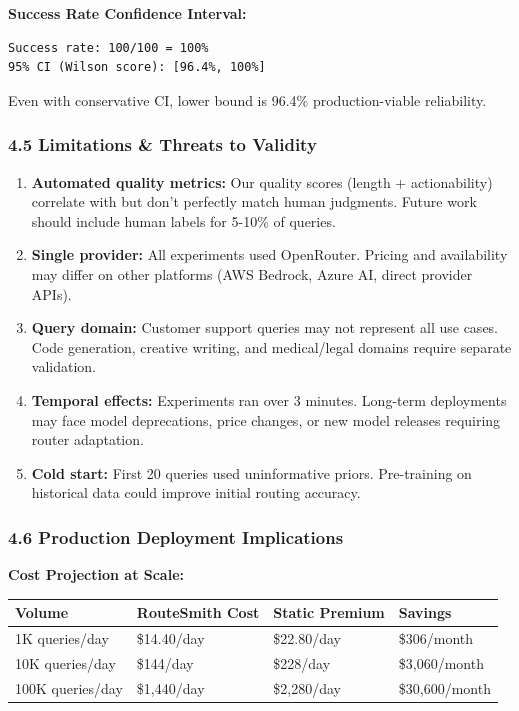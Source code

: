\textbf{Success Rate Confidence Interval:}

\begin{verbatim}
Success rate: 100/100 = 100%
95% CI (Wilson score): [96.4%, 100%]
\end{verbatim}

Even with conservative CI, lower bound is 96.4\% production-viable
reliability.

\hypertarget{limitations-threats-to-validity}{%
\subsubsection{4.5 Limitations \& Threats to
Validity}\label{limitations-threats-to-validity}}

\begin{enumerate}
\def\labelenumi{\arabic{enumi}.}
\item
  \textbf{Automated quality metrics:} Our quality scores (length +
  actionability) correlate with but don't perfectly match human
  judgments. Future work should include human labels for 5-10\% of
  queries.
\item
  \textbf{Single provider:} All experiments used OpenRouter. Pricing and
  availability may differ on other platforms (AWS Bedrock, Azure AI,
  direct provider APIs).
\item
  \textbf{Query domain:} Customer support queries may not represent all
  use cases. Code generation, creative writing, and medical/legal
  domains require separate validation.
\item
  \textbf{Temporal effects:} Experiments ran over 3 minutes. Long-term
  deployments may face model deprecations, price changes, or new model
  releases requiring router adaptation.
\item
  \textbf{Cold start:} First 20 queries used uninformative priors.
  Pre-training on historical data could improve initial routing
  accuracy.
\end{enumerate}

\hypertarget{production-deployment-implications}{%
\subsubsection{4.6 Production Deployment
Implications}\label{production-deployment-implications}}

\textbf{Cost Projection at Scale:}

\begin{longtable}[]{@{}llll@{}}
\toprule
Volume & RouteSmith Cost & Static Premium & Savings \\
\midrule
\endhead
1K queries/day & \$14.40/day & \$22.80/day & \$306/month \\
10K queries/day & \$144/day & \$228/day & \$3,060/month \\
100K queries/day & \$1,440/day & \$2,280/day & \$30,600/month \\
\bottomrule
\end{longtable}

